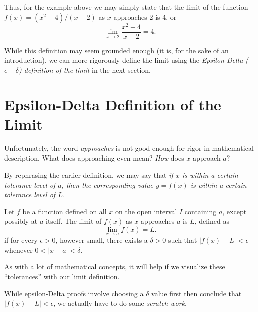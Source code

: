 Thus, for the example above we may simply state that the limit of the function $f(x) = (x^2-4)/(x-2)$ as $x$ approaches 2 is 4, or
\begin{equation}
	\lim_{x\to 2} \frac{x^2-4}{x-2} = 4.
\end{equation}

While this definition may seem grounded enough (it is, for the sake of an introduction), we can more rigorously define the limit using the \textit{Epsilon-Delta ($\epsilon-\delta$) definition of the limit} in the next section.

\section{Epsilon-Delta Definition of the Limit}
Unfortunately, the word \textit{approaches} is not good enough for rigor in mathematical description. What does approaching even mean? \textit{How} does $x$ approach $a$?

By rephrasing the earlier definition, we may say that \textit{if $x$ is within a certain tolerance level of $a$, then the corresponding value $y=f(x)$ is within a certain tolerance level of $L$.}
\begin{defn}
	Let $f$ be a function defined on all $x$ on the open interval $I$ containing $a$, except possibly at $a$ itself. The limit of $f(x)$ as $x$ approaches $a$ is $L$, defined as
	\begin{equation}
		\lim_{x\to a} f(x) = L.
	\end{equation}
	if for every $\epsilon > 0$, however small, there exists a $\delta > 0$ such that $|f(x)-L| < \epsilon$ whenever $0 < |x-a| < \delta$.
\end{defn}
As with a lot of mathematical concepts, it will help if we visualize these ``tolerances'' with our limit definition.

While epsilon-Delta proofs involve choosing a $\delta$ value first then conclude that $|f(x)-L|<\epsilon$, we actually have to do some \textit{scratch work}.

